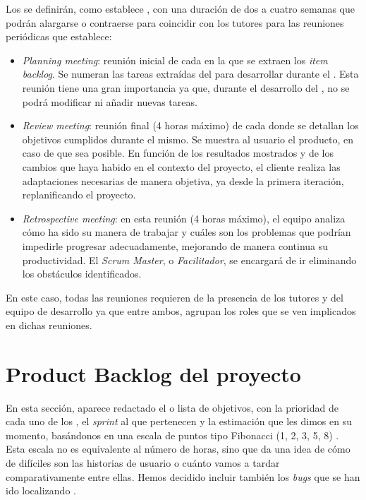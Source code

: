 Los \sprints{} se definirán, como establece \scrum{}, con una duración de dos a cuatro semanas que podrán alargarse o contraerse para coincidir con los tutores para las reuniones periódicas que establece:
\begin{itemize}
 \item \textit{Planning meeting}: reunión inicial de cada \sprint{} en la que se extraen los \textit{item backlog}. Se numeran las tareas extraídas del \productbacklog{} para desarrollar durante el \sprint{}. Esta reunión tiene una gran importancia ya que, durante el desarrollo del \sprint{}, no se podrá modificar ni añadir nuevas tareas.
 \item \textit{Review meeting}: reunión final (4 horas máximo) de cada \sprint{} donde se detallan los objetivos cumplidos durante el mismo. Se muestra al usuario el producto, en caso de que sea posible. En función de los resultados mostrados y de los cambios que haya habido en el contexto del proyecto, el cliente realiza las adaptaciones necesarias de manera objetiva, ya desde la primera iteración, replanificando el proyecto.
 \item \textit{Retrospective meeting}: en esta reunión (4 horas máximo), el equipo analiza cómo ha sido su manera de trabajar y cuáles son los problemas que podrían impedirle progresar adecuadamente, mejorando de manera continua su productividad. El \textit{Scrum Master}, o \textit{Facilitador}, se encargará de ir eliminando los obstáculos identificados.
\end{itemize}

En este caso, todas las reuniones requieren de la presencia de los tutores y del equipo de desarrollo ya que entre ambos, agrupan los roles que se ven implicados en dichas reuniones.
\newpage



\section{Product Backlog del proyecto}
En esta sección, aparece redactado el \productbacklog{}  o lista de objetivos, con la prioridad de cada uno de los \productitem{}, el \textit{sprint} al que pertenecen y la estimación que les dimos en su momento, basándonos en una escala de puntos tipo Fibonacci (1, 2, 3, 5, 8) \cite{what}. Esta escala no es equivalente al número de horas, sino que da una idea de cómo de difíciles son las historias de usuario o cuánto vamos a tardar comparativamente entre ellas. Hemos decidido incluir también los \textit{bugs} que se han ido localizando \cite{product}.

